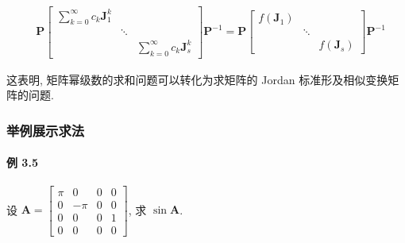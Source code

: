 \begin{align*}
     & \bm{P}
    \begin{bmatrix}
        \sum_{k=0}^\infty c_k \bm{J}_1^k &        &                                  \\
                                         & \ddots &                                  \\
                                         &        & \sum_{k=0}^\infty c_k \bm{J}_s^k
    \end{bmatrix}
    \bm{P}^{-1} = \bm{P}
    \begin{bmatrix}
        f(\bm{J}_1) &        &             \\
                    & \ddots &             \\
                    &        & f(\bm{J}_s)
    \end{bmatrix} \bm{P}^{-1}
\end{align*}

这表明, 矩阵幂级数的求和问题可以转化为求矩阵的 Jordan 标准形及相似变换矩
阵的问题.

\subsubsection{举例展示求法}

\paragraph*{例 3.5} 设 $\bm{A} = \begin{bmatrix}
    \pi & 0    & 0 & 0 \\
    0   & -\pi & 0 & 0 \\
    0   & 0    & 0 & 1 \\
    0   & 0    & 0 & 0
\end{bmatrix}$, 求 $\sin \bm{A}$.

